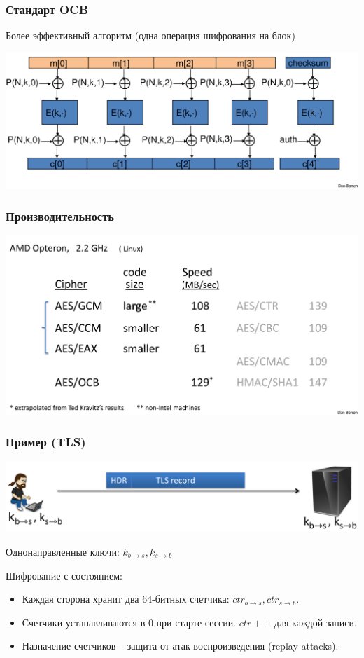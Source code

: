 \documentclass{beamer}
\begin{document}
\begin{frame}
  \frametitle{Стандарт OCB}

  Более эффективный алгоритм (одна операция шифрования на блок)

  \includegraphics[width=\linewidth]{./img/png/OCB.png}
\end{frame}

\begin{frame}
  \frametitle{Производительность}

  \includegraphics[width=\linewidth]{./img/png/performance.png}
\end{frame}

\begin{frame}
  \frametitle{Пример (TLS)}

  \includegraphics[width=\linewidth]{./img/png/TLS_overview.png}

  Однонаправленные ключи: $k_{b \rightarrow s}, k_{s \rightarrow b}$

  Шифрование с состоянием:
  \begin{itemize}
    \item{Каждая сторона хранит два 64-битных счетчика: $ctr_{b \rightarrow s}, ctr_{s \rightarrow b}$.}
    \item{Счетчики устанавливаются в 0 при старте сессии. $ctr++$ для каждой записи.}
    \item{Назначение счетчиков -- защита от атак воспроизведения (replay attacks).}
  \end{itemize}
\end{frame}
\end{document}

